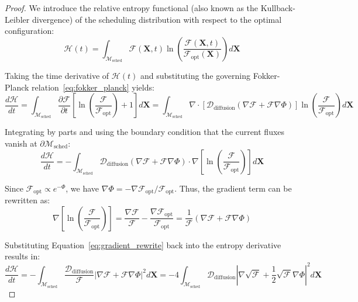 \documentclass[11pt,a4paper]{book}
\begin{document}
\begin{proof}
We introduce the relative entropy functional (also known as the Kullback-Leibler divergence) of the scheduling distribution with respect to the optimal configuration:
\begin{equation}
\label{eq:relative_entropy}
\mathcal{H}(t) = \int_{\mathcal{M}_{\text{sched}}} \mathcal{F}(\mathbf{X}, t) \ln \left( \frac{\mathcal{F}(\mathbf{X}, t)}{\mathcal{F}_{\text{opt}}(\mathbf{X})} \right) d\mathbf{X}
\end{equation}

Taking the time derivative of $\mathcal{H}(t)$ and substituting the governing Fokker-Planck relation~\eqref{eq:fokker_planck} yields:
\begin{equation}
\label{eq:relative_entropy_deriv}
\frac{d\mathcal{H}}{dt} = \int_{\mathcal{M}_{\text{sched}}} \frac{\partial \mathcal{F}}{\partial t} \left[ \ln \left(\frac{\mathcal{F}}{\mathcal{F}_{\text{opt}}}\right) + 1 \right] d\mathbf{X} = \int_{\mathcal{M}_{\text{sched}}} \nabla \cdot \left[ \mathcal{D}_{\text{diffusion}} \left( \nabla \mathcal{F} + \mathcal{F} \nabla \Phi \right) \right] \ln \left(\frac{\mathcal{F}}{\mathcal{F}_{\text{opt}}}\right) d\mathbf{X}
\end{equation}

Integrating by parts and using the boundary condition that the current fluxes vanish at $\partial \mathcal{M}_{\text{sched}}$:
\begin{equation}
\label{eq:integration_by_parts_entropy}
\frac{d\mathcal{H}}{dt} = -\int_{\mathcal{M}_{\text{sched}}} \mathcal{D}_{\text{diffusion}} \left( \nabla \mathcal{F} + \mathcal{F} \nabla \Phi \right) \cdot \nabla \left[ \ln \left(\frac{\mathcal{F}}{\mathcal{F}_{\text{opt}}}\right) \right] d\mathbf{X}
\end{equation}

Since $\mathcal{F}_{\text{opt}} \propto e^{-\Phi}$, we have $\nabla \Phi = -\nabla \mathcal{F}_{\text{opt}} / \mathcal{F}_{\text{opt}}$. Thus, the gradient term can be rewritten as:
\begin{equation}
\label{eq:gradient_rewrite}
\nabla \left[ \ln \left(\frac{\mathcal{F}}{\mathcal{F}_{\text{opt}}}\right) \right] = \frac{\nabla \mathcal{F}}{\mathcal{F}} - \frac{\nabla \mathcal{F}_{\text{opt}}}{\mathcal{F}_{\text{opt}}} = \frac{1}{\mathcal{F}} \left( \nabla \mathcal{F} + \mathcal{F} \nabla \Phi \right)
\end{equation}

Substituting Equation~\eqref{eq:gradient_rewrite} back into the entropy derivative results in:
\begin{equation}
\label{eq:entropy_fisher_information}
\frac{d\mathcal{H}}{dt} = -\int_{\mathcal{M}_{\text{sched}}} \frac{\mathcal{D}_{\text{diffusion}}}{\mathcal{F}} \left| \nabla \mathcal{F} + \mathcal{F} \nabla \Phi \right|^2 d\mathbf{X} = -4 \int_{\mathcal{M}_{\text{sched}}} \mathcal{D}_{\text{diffusion}} \left| \nabla \sqrt{\mathcal{F}} + \frac{1}{2} \sqrt{\mathcal{F}} \nabla \Phi \right|^2 d\mathbf{X}
\end{equation}


\end{proof}
\end{document}
